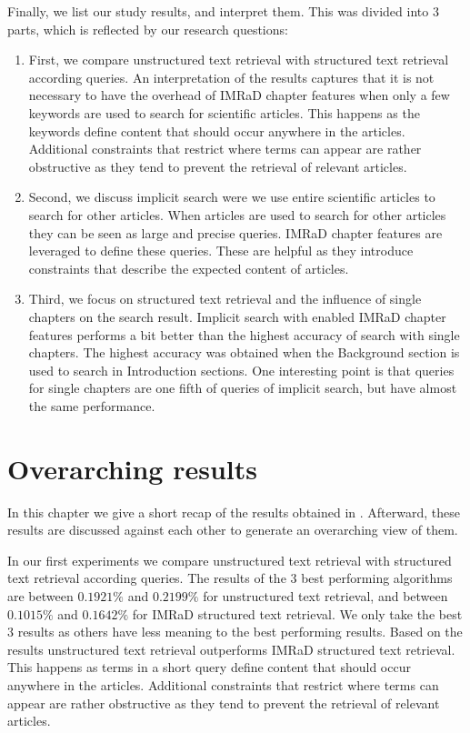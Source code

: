 Finally, we list our study results, and interpret them. This was divided into $3$ parts, which is reflected by our research questions:
\begin{enumerate}[label=(\alph*)]
  \item First, we compare unstructured text retrieval with structured text retrieval according queries. An interpretation of the results captures that it is not necessary to have the overhead of IMRaD chapter features when only a few keywords are used to search for scientific articles. This happens as the keywords define content that should occur anywhere in the articles. Additional constraints that restrict where terms can appear are rather obstructive as they tend to prevent the retrieval of relevant articles.
  \item Second, we discuss implicit search were we use entire scientific articles to search for other articles. When articles are used to search for other articles they can be seen as large and precise queries. IMRaD chapter features are leveraged to define these queries. These are helpful as they introduce constraints that describe the expected content of articles.
  \item Third, we focus on structured text retrieval and the influence of single chapters on the search result. Implicit search with enabled IMRaD chapter features performs a bit better than the highest accuracy of search with single chapters. The highest accuracy was obtained when the Background section is used to search in Introduction sections. One interesting point is that queries for single chapters are one fifth of queries of implicit search, but have almost the same performance.
\end{enumerate}

\section{Overarching results}
\label{sec:overarching_results}

In this chapter we give a short recap of the results obtained in . Afterward, these results are discussed against each other to generate an overarching view of them.

In our first experiments we compare unstructured text retrieval with structured text retrieval according queries. The results of the $3$ best performing algorithms are between $0.1921\%$ and $0.2199\%$ for unstructured text retrieval, and between $0.1015\%$ and $0.1642\%$ for IMRaD structured text retrieval. We only take the best $3$ results as others have less meaning to the best performing results. Based on the results unstructured text retrieval outperforms IMRaD structured text retrieval. This happens as terms in a short query define content that should occur anywhere in the articles. Additional constraints that restrict where terms can appear are rather obstructive as they tend to prevent the retrieval of relevant articles.


